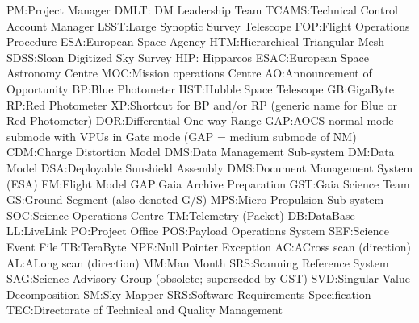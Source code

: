 PM:Project Manager
DMLT: DM Leadership Team
TCAMS:Technical Control Account Manager
LSST:Large Synoptic Survey Telescope
FOP:Flight Operations Procedure
ESA:European Space Agency
HTM:Hierarchical Triangular Mesh
SDSS:Sloan Digitized Sky Survey
HIP: Hipparcos
ESAC:European Space Astronomy Centre
MOC:Mission operations Centre
AO:Announcement of Opportunity
BP:Blue Photometer
HST:Hubble Space Telescope
GB:GigaByte
RP:Red Photometer
XP:Shortcut for BP and/or RP (generic name for Blue or Red Photometer)
DOR:Differential One-way Range
GAP:AOCS normal-mode submode with VPUs in Gate mode (GAP = medium submode of NM)
CDM:Charge Distortion Model
DMS:Data Management Sub-system
DM:Data Model
DSA:Deployable Sunshield Assembly
DMS:Document Management System (ESA)
FM:Flight Model
GAP:Gaia Archive Preparation
GST:Gaia Science Team
GS:Ground Segment (also denoted G/S)
MPS:Micro-Propulsion Sub-system
SOC:Science Operations Centre
TM:Telemetry (Packet)
DB:DataBase
LL:LiveLink
PO:Project Office
POS:Payload Operations System
SEF:Science Event File
TB:TeraByte
NPE:Null Pointer Exception
AC:ACross scan (direction)
AL:ALong scan (direction)
MM:Man Month
SRS:Scanning Reference System
SAG:Science Advisory Group (obsolete; superseded by GST)
SVD:Singular Value Decomposition
SM:Sky Mapper
SRS:Software Requirements Specification
TEC:Directorate of Technical and Quality Management
